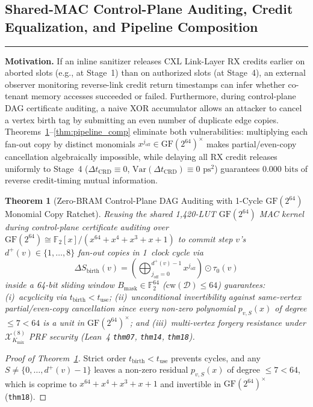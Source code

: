 \documentclass[10pt,twocolumn]{article}
\makeatletter
\newif\ifspecintwocol \specintwocolfalse
\newif\ifspecresume   \specresumefalse
\newcommand{\StopTwoCol}{%
  \if@twocolumn
    \onecolumn
    \global\specintwocolfalse
    \let\spec@next\@empty
  \else
    \ifspecintwocol
      \global\specintwocolfalse
      \def\spec@next{\end{multicols}}%
    \else
      \let\spec@next\@empty
    \fi
  \fi
  \spec@next
}
\newcommand{\BeginConnesPlate}{%
  \if@twocolumn
    \onecolumn
    \global\specresumetrue
    \let\spec@platepre\@empty
  \else
    \ifspecintwocol
      \global\specresumetrue
      \let\spec@platepre\StopTwoCol
    \else
      \global\specresumefalse
      \let\spec@platepre\@empty
    \fi
  \fi
  \spec@platepre
  \par\vspace{4pt}\noindent\textcolor{black!25}{\rule{\textwidth}{0.4pt}}\par\vspace{3pt}%
}
\providecommand{\SharedCubicMacLUTs}{1,420}
\theoremstyle{spectralthm}
\newtheorem{theorem}{Theorem}[section]
\makeatother
\begin{document}
\subsection{Shared-MAC Control-Plane Auditing, Credit Equalization, and Pipeline Composition}

\BeginConnesPlate
\noindent\textbf{Motivation.}\; If an inline sanitizer releases CXL Link-Layer RX credits earlier on aborted slots (e.g., at Stage~1) than on authorized slots (at Stage~4), an external observer monitoring reverse-link credit return timestamps can infer whether co-tenant memory accesses succeeded or failed. Furthermore, during control-plane DAG certificate auditing, a naive XOR accumulator allows an attacker to cancel a vertex birth tag by submitting an even number of duplicate edge copies. Theorems~\ref{thm:dag}--\ref{thm:pipeline_comp} eliminate both vulnerabilities: multiplying each fan-out copy by distinct monomials $x^{j_{\mathrm{off}}} \in \mathrm{GF}(2^{64})^\times$ makes partial/even-copy cancellation algebraically impossible, while delaying all RX credit releases uniformly to Stage~4 ($\Delta t_{\mathrm{CRD}} \equiv 0$, $\mathrm{Var}(\Delta t_{\mathrm{CRD}}) \equiv 0\text{~ps}^2$) guarantees $0.000\text{~bits}$ of reverse credit-timing mutual information.

\begin{theorem}[Zero-BRAM Control-Plane DAG Auditing with 1-Cycle $\mathrm{GF}(2^{64})$ Monomial Copy Ratchet]
\label{thm:dag}
Reusing the shared \SharedCubicMacLUTs-LUT $\mathrm{GF}(2^{64})$ MAC kernel during control-plane certificate auditing over $\mathrm{GF}(2^{64}) \cong \mathbb{F}_2[x]/(x^{64} + x^4 + x^3 + x + 1)$ to commit step $v$'s $d^+(v) \in \{1,\ldots,8\}$ fan-out copies in 1~clock cycle via
\begin{equation}
\label{eq:monomial_dag}
\Delta S_{\mathrm{birth}}(v) = \left(\bigoplus_{j_{\mathrm{off}}=0}^{d^+(v)-1} x^{j_{\mathrm{off}}}\right) \odot \tau_0(v)
\end{equation}
inside a 64-bit sliding window $B_{\mathrm{mask}} \in \mathbb{F}_2^{64}$ ($\mathrm{cw}(\mathcal{D}) \le 64$) guarantees: (i)~acyclicity via $t_{\mathrm{birth}} < t_{\mathrm{use}}$; (ii)~unconditional invertibility against same-vertex partial/even-copy cancellation since every non-zero polynomial $p_{v,S}(x)$ of degree $\le 7 < 64$ is a unit in $\mathrm{GF}(2^{64})^\times$; and (iii)~multi-vertex forgery resistance under $\mathcal{X}_{K_{\mathrm{mix}}}^{(8)}$ PRF security (Lean~4 \texttt{thm07}, \texttt{thm14}, \texttt{thm18}).
\end{theorem}
\begin{proof}[Proof of Theorem~\ref{thm:dag}]
Strict order $t_{\mathrm{birth}} < t_{\mathrm{use}}$ prevents cycles, and any $S \neq \{0,\ldots,d^+(v)-1\}$ leaves a non-zero residual $p_{v,S}(x)$ of degree $\le 7 < 64$, which is coprime to $x^{64}+x^4+x^3+x+1$ and invertible in $\mathrm{GF}(2^{64})^\times$ (\texttt{thm18}).
\end{proof}
\end{document}
